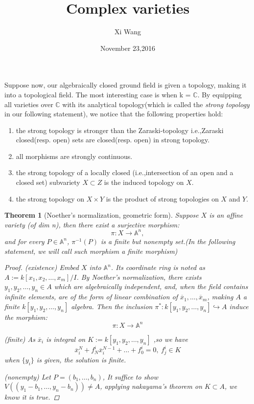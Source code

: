 \documentclass[a4paper]{article}
\author{Xi Wang}
\title{Complex varieties}
\date{November 23,2016}
\newtheorem{thm}{Theorem}
\theoremstyle{definition}
\theoremstyle{remark}
\begin{document}
  \maketitle
  Suppose now, our algebraically closed ground field is given a topology, making it into a topological field. The most interesting case is when k = $\mathbb{C}$. By equipping all varieties over $\mathbb{C}$ with its analytical topology(which is called the \emph{strong topology} in our following statement), we notice that the following properties hold:
  \begin{enumerate}[itemsep=0pt,parsep=0.2pt]
    \item the strong topology is stronger than the Zaraski-topology i.e.,Zaraski closed(resp. open) sets are closed(resp. open) in strong topology.
    \item all morphisms are strongly continuous.
    \item the strong topology of a locally closed (i.e.,intersection of an open and a closed set) subvariety $X \subset Z$ is the induced topology on $X$.
    \item the strong topology on $X \times Y$ is the product of strong topologies on $X$ and $Y$.\vspace{4ex}
  \end{enumerate}


  \noindent{}

  \begin{thm}[Noether's normalization, geometric form]
    Suppose $X$ is an affine variety (of dim n), then there exist a surjective morphism: \[\pi: X \longrightarrow \mathbb{A}^n, \] and for every $P\in \mathbb{A}^n$, $\pi^{-1}(P)$ is a finite but nonempty set.(In the following statement, we will call such morphism a finite morphism)
       \begin{proof}
          (existence) Embed $X$ into $\mathbb{A}^n$. Its coordinate ring is noted as $A:=k[x_1,x_2,\dots,x_m]/I$. By Noether's normalization, there exists $y_1,y_2,\dots,y_n\in A$ which are algebraically independent, and, when the field contains infinite elements, are of the form of linear combination of $\overline{x}_1,\dots,\overline{x}_m$, making $A$ a finite $k[y_1,y_2,\dots,y_n]$ algebra. Then the inclusion $\pi^*:k[y_1,y_2,\dots,y_n]  \hookrightarrow A$ induce the morphism: \[\pi: X \longrightarrow \mathbb{A}^n\]

          (finite) As $\overline{x}_i$ is integral on $K:=k[y_1,y_2,\dots,y_n]$ ,so we have \[\overline{x}_i^N+f^i_N\overline{x}_i^{N-1}+\dots+f_0^i = 0, \ f^i_j \in K\] when $\{y_i\}$ is given, the solution is finite.\vspace{2ex}

          (nonempty) Let $P=(b_1,\dots,b_n)$, It suffice to show $V((y_1-b_1,\dots,y_n-b_n)) \not= A$, applying nakayama's theorem on $K\subset A$, we know it is true.
       \end{proof}
  \end{thm}
\end{document}
